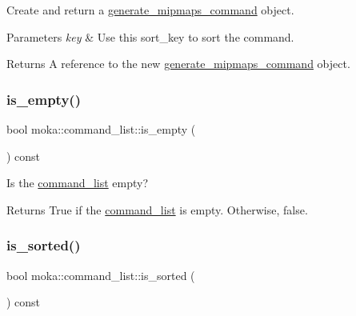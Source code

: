 Create and return a \mbox{\hyperlink{classmoka_1_1generate__mipmaps__command}{generate\+\_\+mipmaps\+\_\+command}} object. 


\begin{DoxyParams}{Parameters}
{\em key} & Use this sort\+\_\+key to sort the command. \\
\hline
\end{DoxyParams}
\begin{DoxyReturn}{Returns}
A reference to the new \mbox{\hyperlink{classmoka_1_1generate__mipmaps__command}{generate\+\_\+mipmaps\+\_\+command}} object. 
\end{DoxyReturn}
\mbox{\label{classmoka_1_1command__list_ac024606b9c2c52bf6a882ea0d8b28022}} 
\subsubsection{\texorpdfstring{is\_empty()}{is\_empty()}}
{\footnotesize\ttfamily bool moka\+::command\+\_\+list\+::is\+\_\+empty (\begin{DoxyParamCaption}{ }\end{DoxyParamCaption}) const}



Is the \mbox{\hyperlink{classmoka_1_1command__list}{command\+\_\+list}} empty? 

\begin{DoxyReturn}{Returns}
True if the \mbox{\hyperlink{classmoka_1_1command__list}{command\+\_\+list}} is empty. Otherwise, false. 
\end{DoxyReturn}
\mbox{\label{classmoka_1_1command__list_a701506237d0c2d8287be286e8251bdfd}} 
\subsubsection{\texorpdfstring{is\_sorted()}{is\_sorted()}}
{\footnotesize\ttfamily bool moka\+::command\+\_\+list\+::is\+\_\+sorted (\begin{DoxyParamCaption}{ }\end{DoxyParamCaption}) const}



